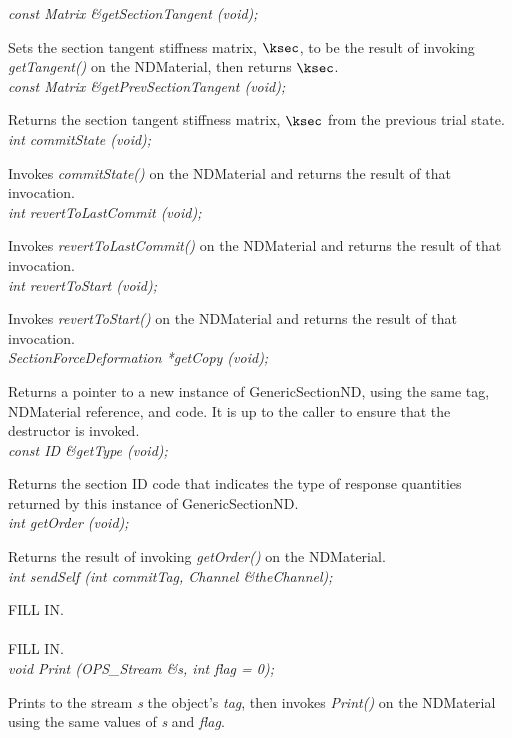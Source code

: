 {\em const Matrix \&getSectionTangent (void); } 

Sets the section tangent stiffness matrix, $\ksec$, to be the result of
invoking {\em getTangent()} on the NDMaterial, then returns $\ksec$. \\

{\em const Matrix \&getPrevSectionTangent (void); } 

Returns the section tangent stiffness matrix, $\ksec$ from the previous trial state. \\

{\em int commitState (void); } 

Invokes {\em commitState()} on the NDMaterial and returns the
result of that invocation. \\

{\em int revertToLastCommit (void); } 

Invokes {\em revertToLastCommit()} on the NDMaterial and returns the
result of that invocation. \\

{\em int revertToStart (void); } 

Invokes {\em revertToStart()} on the NDMaterial and returns the
result of that invocation. \\

{\em SectionForceDeformation *getCopy (void); } 

Returns a pointer to a new instance of GenericSectionND, using the
same tag, NDMaterial reference, and code. It is up to the caller to
ensure that the destructor is invoked. \\

{\em const ID \&getType (void); } 

Returns the section ID code that indicates the type of response quantities
returned by this instance of GenericSectionND. \\

{\em int getOrder (void); } 

Returns the result of invoking {\em getOrder()} on the NDMaterial. \\

{\em int sendSelf (int commitTag, Channel \&theChannel); }

FILL IN. \\

\\
FILL IN. \\

{\em void Print (OPS_Stream \&s, int flag = 0);} 

Prints to the stream {\em s} the object's {\em tag}, then invokes
{\em Print()} on the NDMaterial using the same values of {\em s}
and {\em flag}. \\
